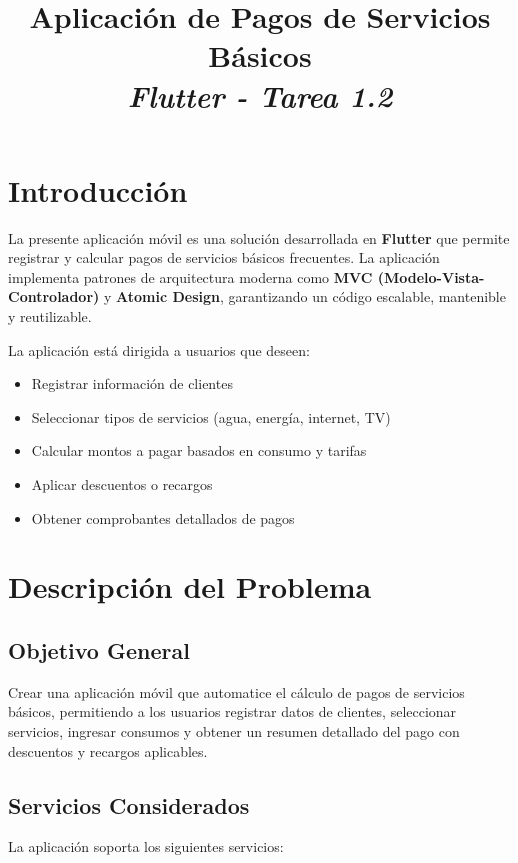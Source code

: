 \documentclass[11pt,a4paper]{article}
\title{\textbf{Aplicación de Pagos de Servicios Básicos} \\ \textit{Flutter - Tarea 1.2}}
\author{}
\date{}
\begin{document}
\maketitle
\vspace{-1cm}

\section{Introducción}

La presente aplicación móvil es una solución desarrollada en \textbf{Flutter} que permite registrar y calcular pagos de servicios básicos frecuentes. La aplicación implementa patrones de arquitectura moderna como \textbf{MVC (Modelo-Vista-Controlador)} y \textbf{Atomic Design}, garantizando un código escalable, mantenible y reutilizable.

La aplicación está dirigida a usuarios que deseen:
\begin{itemize}
    \item Registrar información de clientes
    \item Seleccionar tipos de servicios (agua, energía, internet, TV)
    \item Calcular montos a pagar basados en consumo y tarifas
    \item Aplicar descuentos o recargos
    \item Obtener comprobantes detallados de pagos
\end{itemize}

\section{Descripción del Problema}

\subsection{Objetivo General}

Crear una aplicación móvil que automatice el cálculo de pagos de servicios básicos, permitiendo a los usuarios registrar datos de clientes, seleccionar servicios, ingresar consumos y obtener un resumen detallado del pago con descuentos y recargos aplicables.

\subsection{Servicios Considerados}

La aplicación soporta los siguientes servicios:
\end{document}
